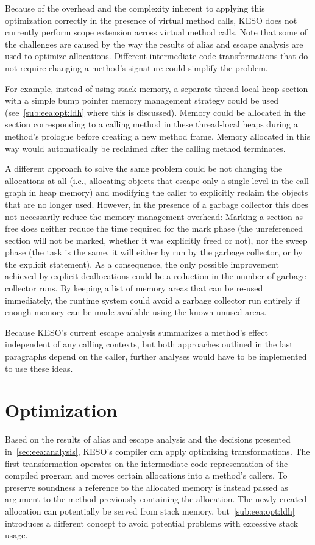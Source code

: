 			Because of the overhead and the complexity inherent to applying this optimization correctly in the presence of
			virtual method calls, KESO does not currently perform scope extension across virtual method calls. Note that some
			of the challenges are caused by the way the results of alias and escape analysis are used to optimize allocations.
			Different intermediate code transformations that do not require changing a method's signature could simplify the
			problem.

			For example, instead of using stack memory, a separate thread-local heap section with a simple bump pointer memory
			management strategy could be used (see~\cref{sub:eea:opt:ldh} where this is discussed). Memory could be allocated
			in the section corresponding to a calling method in these thread-local heaps during a method's prologue before
			creating a new method frame. Memory allocated in this way would automatically be reclaimed after the calling
			method terminates.

			A different approach to solve the same problem could be not changing the allocations at all (i.e., allocating
			objects that escape only a single level in the call graph in heap memory) and modifying the caller to explicitly
			reclaim the objects that are no longer used. However, in the presence of a garbage collector this does not
			necessarily reduce the memory management overhead: Marking a section as free does neither reduce the time required
			for the mark phase (the unreferenced section will not be marked, whether it was explicitly freed or not), nor the
			sweep phase (the task is the same, it will either by run by the garbage collector, or by the explicit statement).
			As a consequence, the only possible improvement achieved by explicit deallocations could be a reduction in the
			number of garbage collector runs. By keeping a list of memory areas that can be re-used immediately, the runtime
			system could avoid a garbage collector run entirely if enough memory can be made available using the known unused
			areas.

			Because KESO's current escape analysis summarizes a method's effect independent of any calling contexts, but both
			approaches outlined in the last paragraphs depend on the caller, further analyses would have to be implemented to
			use these ideas.

	\section{Optimization}
		\label{sec:eea:opt}
		Based on the results of alias and escape analysis and the decisions presented in~\cref{sec:eea:analysis}, KESO's
		compiler can apply optimizing transformations. The first transformation operates on the intermediate code
		representation of the compiled program and moves certain allocations into a method's callers. To preserve soundness
		a reference to the allocated memory is instead passed as argument to the method previously containing the
		allocation. The newly created allocation can potentially be served from stack memory, but~\cref{sub:eea:opt:ldh}
		introduces a different concept to avoid potential problems with excessive stack usage.

